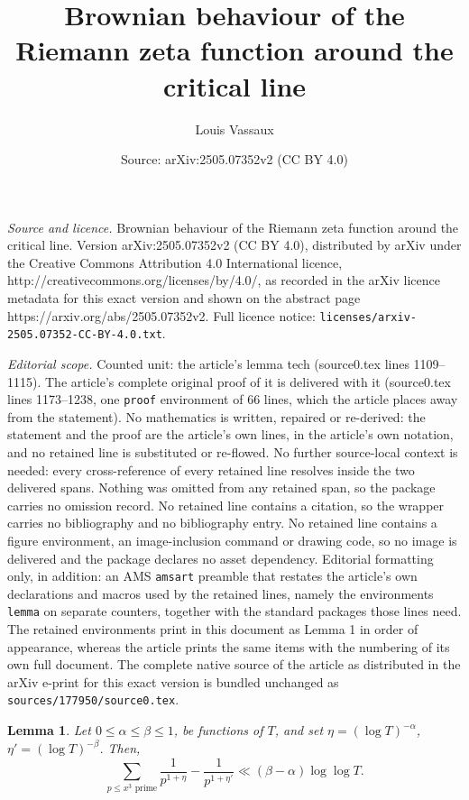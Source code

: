 \documentclass[10pt,a4paper]{amsart}
\title{Brownian behaviour of the Riemann zeta function around the critical line}
\author{Louis Vassaux}
\date{Source: arXiv:2505.07352v2 (CC BY 4.0)}
\newtheorem{lemma}{Lemma}
\renewcommand{\leq}{\leqslant}
\begin{document}
\maketitle

\noindent\emph{Source and licence.} Brownian behaviour of the Riemann zeta function around the critical line. Version arXiv:2505.07352v2 (CC BY 4.0), distributed by arXiv under the Creative Commons Attribution 4.0 International licence, http://creativecommons.org/licenses/by/4.0/, as recorded in the arXiv licence metadata for this exact version and shown on the abstract page https://arxiv.org/abs/2505.07352v2. Full licence notice: \texttt{licenses/arxiv-2505.07352-CC-BY-4.0.txt}.\par\smallskip

\noindent\textit{Editorial scope.} Counted unit: the article's lemma tech (source0.tex lines 1109--1115). The article's complete original proof of it is delivered with it (source0.tex lines 1173--1238, one \texttt{proof} environment of 66 lines, which the article places away from the statement). No mathematics is written, repaired or re-derived: the statement and the proof are the article's own lines, in the article's own notation, and no retained line is substituted or re-flowed.  No further source-local context is needed: every cross-reference of every retained line resolves inside the two delivered spans.  Nothing was omitted from any retained span, so the package carries no omission record.  No retained line contains a citation, so the wrapper carries no bibliography and no bibliography entry.  No retained line contains a figure environment, an image-inclusion command or drawing code, so no image is delivered and the package declares no asset dependency.  Editorial formatting only, in addition: an AMS \texttt{amsart} preamble that restates the article's own declarations and macros used by the retained lines, namely the environments \texttt{lemma} on separate counters, together with the standard packages those lines need.  The retained environments print in this document as Lemma 1 in order of appearance, whereas the article prints the same items with the numbering of its own full document.  The complete native source of the article as distributed in the arXiv e-print for this exact version is bundled unchanged as \texttt{sources/177950/source0.tex}.
\begin{lemma}
\label{tech}
    Let $0 \leq \alpha \leq \beta \leq 1$, be functions of $T$, and set  $\eta = (\log T)^{-\alpha}$, $\eta' = (\log T)^{-\beta}$. Then,
    \begin{equation}
            \sum_{p \leq x^3 \text{ prime}} \frac{1}{p^{1 + \eta}} - \frac{1}{p^{1 + \eta'}} \ll (\beta - \alpha)\log \log T.
    \end{equation}
\end{lemma}
\end{document}

